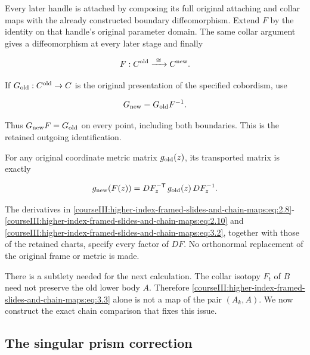 Every later handle is attached by composing its full original attaching and collar maps with the already constructed boundary diffeomorphism. Extend \(F\) by the identity on that handle's original parameter domain. The same collar argument gives a diffeomorphism at every later stage and finally

\begin{equation}
F:C^{\rm old}\xrightarrow{\ \cong\ }C^{\rm new}.
 \label{courseIII:higher-index-framed-slides-and-chain-maps:eq:3.4}
\end{equation}

If \(G_{\rm old}:C^{\rm old}\to C\) is the original presentation of the specified cobordism, use

\begin{equation}
G_{\rm new}=G_{\rm old}F^{-1}.
 \label{courseIII:higher-index-framed-slides-and-chain-maps:eq:3.5}
\end{equation}

Thus \(G_{\rm new}F=G_{\rm old}\) on every point, including both boundaries. This is the retained outgoing identification.

For any original coordinate metric matrix \(g_{\rm old}(z)\), its transported matrix is exactly

\begin{equation}
g_{\rm new}(F(z))
   =D F_z^{-{\mathsf T}}\,g_{\rm old}(z)\,D F_z^{-1}.
 \label{courseIII:higher-index-framed-slides-and-chain-maps:eq:3.6}
\end{equation}

The derivatives in \eqref{courseIII:higher-index-framed-slides-and-chain-maps:eq:2.8}-\eqref{courseIII:higher-index-framed-slides-and-chain-maps:eq:2.10} and \eqref{courseIII:higher-index-framed-slides-and-chain-maps:eq:3.2}, together with those of the retained charts, specify every factor of \(DF\). No orthonormal replacement of the original frame or metric is made.

There is a subtlety needed for the next calculation. The collar isotopy \(F_t\) of \(B\) need not preserve the old lower body \(A\). Therefore \eqref{courseIII:higher-index-framed-slides-and-chain-maps:eq:3.3} alone is not a map of the pair \((A_k,A)\). We now construct the exact chain comparison that fixes this issue.

\subsection{The singular prism correction}
\label{courseIII:higher-index-framed-slides-and-chain-maps:higher-slide-prism}

